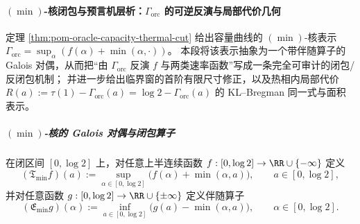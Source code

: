 \paragraph{\texorpdfstring{$(\min)$}{min}-核闭包与预言机层析：\texorpdfstring{$\Gamma_{\mathrm{orc}}$}{Gamma\_orc} 的可逆反演与局部代价几何}
定理 \ref{thm:pom-oracle-capacity-thermal-cut} 给出容量曲线的 \((\min)\)-核表示
\(
\Gamma_{\mathrm{orc}}=\sup_{\alpha}(f(\alpha)+\min(\alpha,\cdot))
\)。
本段将该表示抽象为一个带伴随算子的 Galois 对偶，从而把“由 \(\Gamma_{\mathrm{orc}}\) 反演 \(f\) 与两类速率函数”写成一条完全可审计的闭包/反闭包机制；
并进一步给出临界窗的首阶有限尺寸修正，以及热相内局部代价
\(
R(a):=\tau(1)-\Gamma_{\mathrm{orc}}(a)=\log 2-\Gamma_{\mathrm{orc}}(a)
\)
的 KL--Bregman 同一式与面积表示。

\subparagraph{\texorpdfstring{$(\min)$}{min}-核的 Galois 对偶与闭包算子}
在闭区间 \([0,\log 2]\) 上，对任意上半连续函数 \(f:[0,\log 2]\to\RR\cup\{-\infty\}\) 定义
\begin{equation}\label{eq:pom-min-kernel-closure-operator-T}
(\mathfrak{T}_{\min} f)(a)
:=\sup_{\alpha\in[0,\log 2]}\bigl(f(\alpha)+\min(\alpha,a)\bigr),
\qquad a\in[0,\log 2],
\end{equation}
并对任意函数 \(g:[0,\log 2]\to\RR\cup\{\pm\infty\}\) 定义伴随算子
\begin{equation}\label{eq:pom-min-kernel-erosion-operator-E}
(\mathfrak{E}_{\min} g)(\alpha)
:=\inf_{a\in[0,\log 2]}\bigl(g(a)-\min(\alpha,a)\bigr),
\qquad \alpha\in[0,\log 2].
\end{equation}

